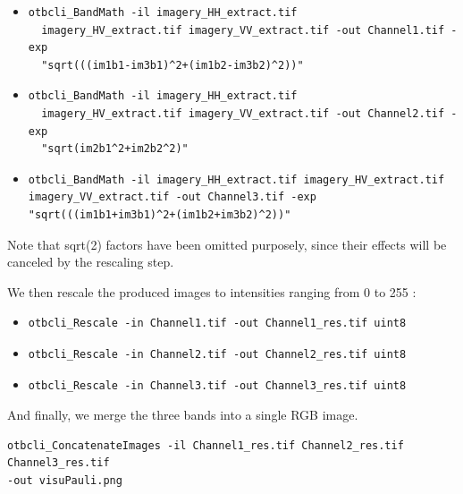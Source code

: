 \begin{itemize}
\item 
\begin{verbatim} 
otbcli_BandMath -il imagery_HH_extract.tif
  imagery_HV_extract.tif imagery_VV_extract.tif -out Channel1.tif -exp
  "sqrt(((im1b1-im3b1)^2+(im1b2-im3b2)^2))" 
\end{verbatim}
									  
\item 
\begin{verbatim} 
otbcli_BandMath -il imagery_HH_extract.tif
  imagery_HV_extract.tif imagery_VV_extract.tif -out Channel2.tif -exp
  "sqrt(im2b1^2+im2b2^2)" 
\end{verbatim}
									  
\item 
\begin{verbatim} 
otbcli_BandMath -il imagery_HH_extract.tif imagery_HV_extract.tif
imagery_VV_extract.tif -out Channel3.tif -exp
"sqrt(((im1b1+im3b1)^2+(im1b2+im3b2)^2))" 
\end{verbatim}
\end{itemize}

Note that sqrt(2) factors have been omitted purposely, since their effects will be canceled by the rescaling step.


We then rescale the produced images to intensities ranging from 0 to 255 :

\begin{itemize}
\item 
\begin{verbatim} 
otbcli_Rescale -in Channel1.tif -out Channel1_res.tif uint8 
\end{verbatim}
									  
\item 
\begin{verbatim} 
otbcli_Rescale -in Channel2.tif -out Channel2_res.tif uint8 
\end{verbatim}
									  
\item 
\begin{verbatim} 
otbcli_Rescale -in Channel3.tif -out Channel3_res.tif uint8 
\end{verbatim}
\end{itemize}

And finally, we merge the three bands into a single RGB image.

\begin{verbatim} 
otbcli_ConcatenateImages -il Channel1_res.tif Channel2_res.tif Channel3_res.tif
-out visuPauli.png 
\end{verbatim}

